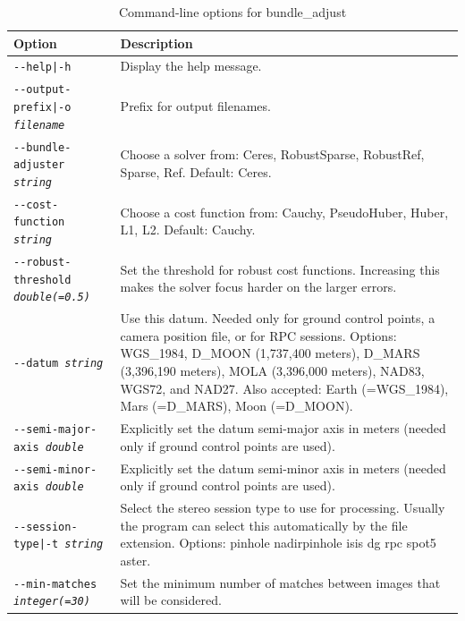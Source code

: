 \begin{longtable}{|l|p{8.0cm}|}
\caption{Command-line options for bundle\_adjust}
\label{tbl:bundleadjust}
\endfirsthead
\endhead
\endfoot
\endlastfoot
\hline
Option & Description \\ \hline \hline
\texttt{-\/-help|-h} & Display the help message. \\ \hline

\texttt{-\/-output-prefix|-o \textit{filename}} & Prefix for output filenames. \\ \hline

\texttt{-\/-bundle-adjuster \textit{string}} & Choose a solver from:
Ceres, RobustSparse, RobustRef, Sparse, Ref. Default: Ceres.\\ \hline

\texttt{-\/-cost-function \textit{string}} & Choose a cost function
from: Cauchy, PseudoHuber, Huber, L1, L2. Default: Cauchy. \\ \hline

\texttt{-\/-robust-threshold \textit{double(=0.5)}} & Set the threshold for robust
cost functions.  Increasing this makes the solver focus harder on the larger errors.\\ \hline

\texttt{-\/-datum \textit{string}} & 
Use this datum. Needed only for ground control points, a camera position file, or for RPC sessions. Options: WGS\_1984, D\_MOON (1,737,400 meters), D\_MARS (3,396,190 meters), MOLA (3,396,000 meters), NAD83, WGS72, and NAD27. Also accepted: Earth (=WGS\_1984), Mars (=D\_MARS), Moon (=D\_MOON). \\ \hline

\texttt{-\/-semi-major-axis \textit{double}} & Explicitly set the datum semi-major axis
in meters (needed only if ground control points are used).\\ \hline
\texttt{-\/-semi-minor-axis \textit{double}} & Explicitly set the datum semi-minor axis
in meters (needed only if ground control points are used).\\ \hline

\texttt{-\/-session-type|-t \textit{string}} & Select the stereo
session type to use for processing. Usually the program can select this
automatically by the file extension. Options: pinhole nadirpinhole isis dg rpc spot5 aster. \\ \hline

\texttt{-\/-min-matches \textit{integer(=30)}} & Set the minimum number of matches
between images that will be considered. \\ \hline


\end{longtable}
